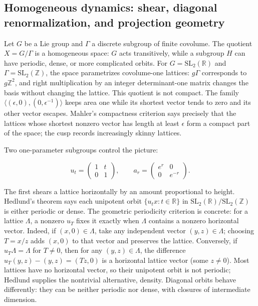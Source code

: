 \subsection{Homogeneous dynamics: shear, diagonal renormalization, and projection geometry}\label{04-visual-computing-ii-ch033-homogeneous-dynamics-shear-diagonal-renormalization-and-projection-geometry-1}

Let \(G\) be a Lie group and \(\Gamma\) a discrete subgroup of finite covolume. The quotient \(X=G/\Gamma\) is a homogeneous space: \(G\) acts transitively, while a subgroup \(H\) can have periodic, dense, or more complicated orbits. For \(G=\mathrm{SL}_2(\mathbb R)\) and \(\Gamma=\mathrm{SL}_2(\mathbb Z)\), the space parametrizes covolume-one lattices: \(g\Gamma\) corresponds to \(g\mathbb Z^2\), and right multiplication by an integer determinant-one matrix changes the basis without changing the lattice. This quotient is not compact. The family \(\langle(\epsilon,0),(0,\epsilon^{-1})\rangle\) keeps area one while its shortest vector tends to zero and its other vector escapes. Mahler's compactness criterion says precisely that the lattices whose shortest nonzero vector has length at least \(\epsilon\) form a compact part of the space; the cusp records increasingly skinny lattices.

Two one-parameter subgroups control the picture:

\[ u_t=\begin{pmatrix}1&t\\0&1\end{pmatrix},\qquad a_r=\begin{pmatrix}e^r&0\\0&e^{-r}\end{pmatrix}. \]

The first shears a lattice horizontally by an amount proportional to height. Hedlund's theorem says each unipotent orbit \(\{u_t x:t\in\mathbb R\}\) in \(\mathrm{SL}_2(\mathbb R)/\mathrm{SL}_2(\mathbb Z)\) is either periodic or dense. The geometric periodicity criterion is concrete: for a lattice \(\Lambda\), a nonzero \(u_T\) fixes it exactly when \(\Lambda\) contains a nonzero horizontal vector. Indeed, if \((x,0)\in\Lambda\), take any independent vector \((y,z)\in\Lambda\); choosing \(T=x/z\) adds \((x,0)\) to that vector and preserves the lattice. Conversely, if \(u_T\Lambda=\Lambda\) for \(T\neq0\), then for any \((y,z)\in\Lambda\), the difference \(u_T(y,z)-(y,z)=(Tz,0)\) is a horizontal lattice vector (some \(z\neq0\)). Most lattices have no horizontal vector, so their unipotent orbit is not periodic; Hedlund supplies the nontrivial alternative, density. Diagonal orbits behave differently: they can be neither periodic nor dense, with closures of intermediate dimension.

